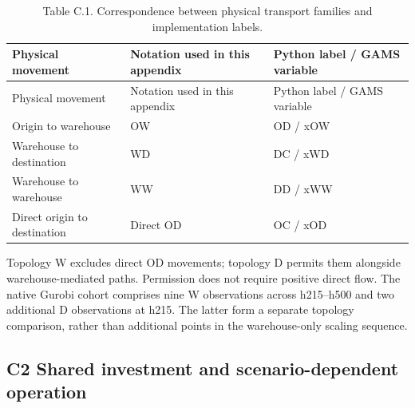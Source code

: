 \documentclass[
  english,
  11pt,
  a4paper,
]{article}
\begin{document}
\begin{longtable}[]{@{}
  >{\raggedright\arraybackslash}p{}
  >{\raggedright\arraybackslash}p{}
  >{\raggedright\arraybackslash}p{}@{}}
\caption{Table C.1. Correspondence between physical transport families
and implementation labels.}\tabularnewline
\toprule\noalign{}
\begin{minipage}[b]{\linewidth}\raggedright
Physical movement
\end{minipage} & \begin{minipage}[b]{\linewidth}\raggedright
Notation used in this appendix
\end{minipage} & \begin{minipage}[b]{\linewidth}\raggedright
Python label / GAMS variable
\end{minipage} \\
\midrule\noalign{}
\endfirsthead
\toprule\noalign{}
\begin{minipage}[b]{\linewidth}\raggedright
Physical movement
\end{minipage} & \begin{minipage}[b]{\linewidth}\raggedright
Notation used in this appendix
\end{minipage} & \begin{minipage}[b]{\linewidth}\raggedright
Python label / GAMS variable
\end{minipage} \\
\midrule\noalign{}
\endhead
\bottomrule\noalign{}
\endlastfoot
Origin to warehouse & OW & OD / xOW \\
Warehouse to destination & WD & DC / xWD \\
Warehouse to warehouse & WW & DD / xWW \\
Direct origin to destination & Direct OD & OC / xOD \\
\end{longtable}

Topology W excludes direct OD movements; topology D permits them alongside warehouse-mediated paths. Permission does not require positive
direct flow. The native Gurobi cohort comprises nine W observations
across h215--h500 and two additional D observations at h215. The latter
form a separate topology comparison, rather than additional points in
the warehouse-only scaling sequence.

\subsection{C2 Shared investment and scenario-dependent
operation}\label{c2-shared-investment-and-scenario-dependent-operation}
\end{document}
